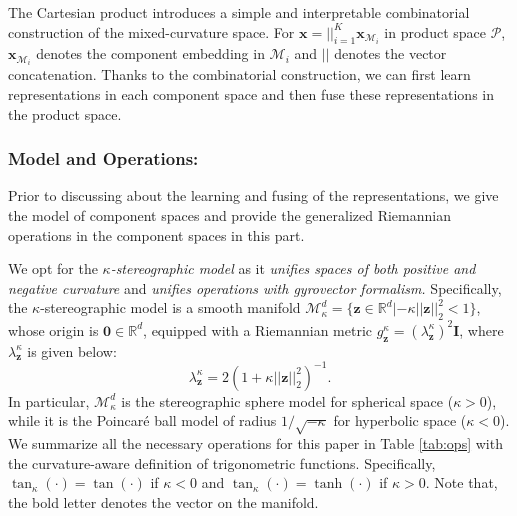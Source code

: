 The Cartesian product introduces a simple and interpretable combinatorial construction of the mixed-curvature space.
For $\mathbf x=||_{i=1}^K \mathbf x_{\mathcal M_i}$ in product space $\mathcal P$, $\mathbf x_{\mathcal M_i}$ denotes the component embedding in  $\mathcal M_i$ and $||$ denotes the vector concatenation.
Thanks to the combinatorial construction, we can first learn representations in each component space and then fuse these representations in the product space.

\subsubsection{Model and Operations:}
Prior to discussing about the learning and fusing of the representations, we give the model of component spaces and provide the generalized Riemannian operations in the component spaces in this part.

We opt for the \emph{$\kappa$-stereographic model} as 
it  
\emph{unifies spaces of both positive and negative curvature} and 
\emph{unifies operations with gyrovector formalism.}
Specifically,  the $\kappa$-stereographic model is a smooth manifold $\mathcal M^d_\kappa=\{\boldsymbol z \in \mathbb R^d  | -\kappa||\boldsymbol z ||_2^2 < 1\}$, whose origin is $\mathbf 0 \in \mathbb R^d$,
equipped with a Riemannian metric 
$g_{\boldsymbol z}^\kappa=(\lambda_{\boldsymbol z}^\kappa)^2 \mathbf I$, 
where $\lambda_{\boldsymbol z}^\kappa$ is given below:
\begin{equation}
\lambda_{\boldsymbol z}^\kappa=2\left(1+\kappa||\boldsymbol z||_2^2\right)^{-1}.
\label{conformalfactor}
\end{equation}
In particular,  $\mathcal M^d_\kappa$ is the stereographic sphere model for spherical space ($\kappa > 0$),
while it is the Poincar\'e ball model of radius $1/ \sqrt{-\kappa}$ for hyperbolic space ($\kappa < 0$).
We summarize all the necessary operations for this paper in Table \ref{tab:ops} 
with the curvature-aware definition of trigonometric functions. 
Specifically, $\tan_\kappa(\cdot)=\tan(\cdot)$ if $\kappa<0$ and $\tan_\kappa(\cdot)=\tanh(\cdot)$ if $\kappa>0$.
Note that, the bold letter denotes the vector on the manifold.


